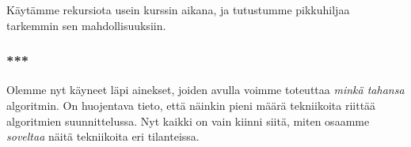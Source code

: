 Käytämme rekursiota usein kurssin aikana,
ja tutustumme pikkuhiljaa tarkemmin sen mahdollisuuksiin.

\subsubsection{***}

Olemme nyt käyneet läpi ainekset,
joiden avulla voimme toteuttaa \emph{minkä tahansa} algoritmin.
On huojentava tieto, että näinkin pieni määrä tekniikoita
riittää algoritmien suunnittelussa.
Nyt kaikki on vain kiinni siitä, miten osaamme \emph{soveltaa}
näitä tekniikoita eri tilanteissa.


% 
% 
% 
% 
% 
% 
% 
%     
% 
% 
% 
